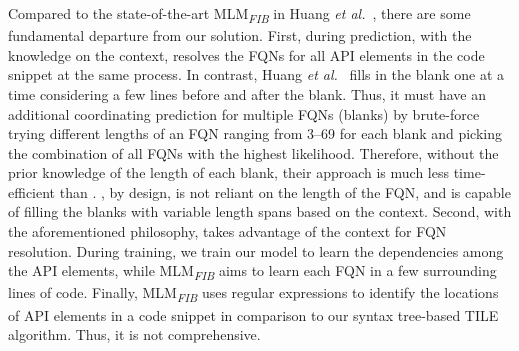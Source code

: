 Compared to the state-of-the-art MLM\textsubscript{\textit{FIB}} in
Huang {\em et al.}~\cite{prompt-ase22}, there are some fundamental
departure from our solution. First, during prediction, with the
knowledge on the context, {\tool} resolves the FQNs for all API
elements in the code snippet at the same process. In contrast, Huang
{\em et al.}~\cite{prompt-ase22} fills in the blank one at a time
considering a few lines before and after the blank. Thus, it must have an
additional coordinating prediction for multiple FQNs (blanks) by
brute-force trying different lengths of an FQN ranging from 3--69 for
each blank and picking the combination of all FQNs with the highest
likelihood. Therefore, without the prior knowledge of the length of
each blank, their approach is much less time-efficient than {\tool}.
{\tool}, by design, is not reliant on the length of the FQN, and is
capable of filling the blanks with variable length spans based on the
context. Second, with the aforementioned philosophy, {\tool} takes
advantage of the context for FQN resolution. During training, we train
our model to learn the dependencies among the API elements, while
MLM\textsubscript{\textit{FIB}} aims to learn each FQN in a few
surrounding lines of code. Finally, MLM\textsubscript{\textit{FIB}}
uses regular expressions to identify the locations of API elements in
a code snippet in comparison to our syntax tree-based TILE
algorithm. Thus, it is not comprehensive.





